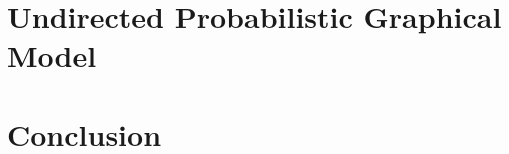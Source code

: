 \documentclass{StyFiles/usydthesis}
\begin{document}
\part{Undirected Probabilistic Graphical Model}
\label{part:2}



\part{Conclusion}
\label{part:3}



%

\backmatter




\printindex
\end{document}

